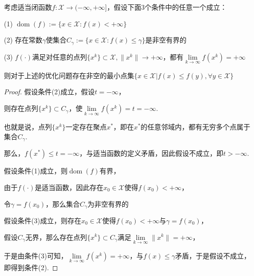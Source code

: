 \begin{theorem}[Weierstrass定理]
    考虑适当闭函数$f: \mathcal{X} \rightarrow (-\infty, +\infty]$，假设下面3个条件中的任意一个成立：

    (1) $\mathop{\mathrm{dom}} (f):=\{x\in \mathcal{X}: f(x) < +\infty\}$

    (2) 存在常数$\gamma$使集合$C_{\gamma}:=\{x\in \mathcal{X}: f(x) \leq \gamma\}$是非空有界的

    (3) $f(\cdot)$满足对任意的点列$\{x^{k}\}\subset \mathcal{X}, \|x^{k}\|\rightarrow +\infty$，都有$\lim\limits_{k\rightarrow \infty} f(x^{k})=+\infty$

    则对于上述的优化问题存在非空的最小点集$\{x\in \mathcal{X} | f(x) \leq f(y), \forall y\in \mathcal{X}\}$
\end{theorem}

\begin{proof}
    假设条件(2)成立，假设$t=-\infty$，
    
    则存在点列$\{x^{k}\}\subset C_{\gamma}$，使$\lim\limits_{k\rightarrow \infty}f(x^{k})=t=-\infty$.
    
    也就是说，点列$\{x^{k}\}$一定存在聚点$x^{*}$，即在$x^{*}$的任意邻域内，都有无穷多个点属于集合$C_{\gamma}$.

    那么，$f(x^{*})\leq t=-\infty$，与适当函数的定义矛盾，因此假设不成立，即$t>-\infty$.

    假设条件(1)成立，则$\mathop{\mathrm{dom}} (f)$有界，

    由于$f(\cdot)$是适当函数，因此存在$x_{0}\in \mathcal{X}$使得$f(x_{0})<+\infty$，

    令$\gamma = f(x_{0})$，那么集合$C_{\gamma}$为非空有界的

    假设条件(3)成立，则存在$x_{0}\in \mathcal{X}$使得$f(x_{0})<+\infty$与$\gamma = f(x_{0})$，

    假设$C_{\gamma}$无界，那么存在点列$\{x^{k}\}\subset C_{\gamma}$满足$\lim\limits_{k\rightarrow \infty} \|x^{k}\| = +\infty$，

    于是由条件(3)可知，$\lim\limits_{k\rightarrow \infty}f(x^{k})=+\infty$，与$f(x)\leq \gamma$矛盾，于是假设不成立，即得到条件(2).
\end{proof}


